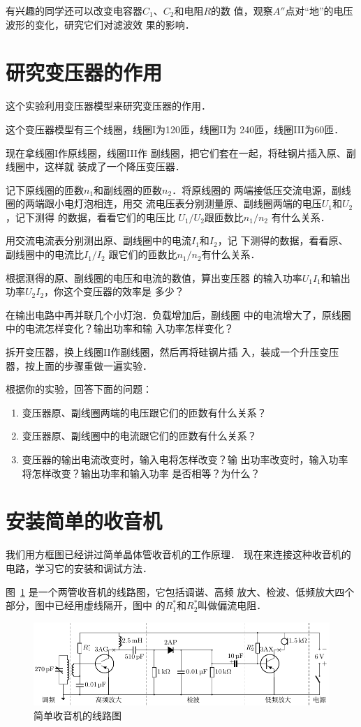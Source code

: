 有兴趣的同学还可以改变电容器$C_1$、$C_2$和电阻$R$的数
值，观察$A''$点对“地”的电压波形的变化，研究它们对滤波效
果的影响．

\section{研究变压器的作用}
这个实验利用变压器模型来研究变压器的作用．

这个变压器模型有三个线圈，线圈I为120匝，线圈II为
240匝，线圈III为60匝．

现在拿线圈I作原线圈，线圈III作
副线圈，把它们套在一起，将硅钢片插入原、副线圈中，这样就
装成了一个降压变压器．

记下原线圈的匝数$n_1$和副线圈的匝数$n_2$．将原线圈的
两端接低压交流电源，副线圈的两端跟小电灯泡相连，用交
流电压表分别测量原、副线圈两端的电压$U_1$和$U_2$，记下测得
的数据，看看它们的电压比
$U_1/U_2$跟匝数比$n_1/n_2$
有什么关系．

用交流电流表分别测出原、副线圈中的电流$I_1$和$I_2$，记
下测得的数据，看看原、副线圈中的电流比$I_1/I_2$
跟它们的匝数比$n_1/n_2$有什么关系．

根据测得的原、副线圈的电压和电流的数值，算出变压器
的输入功率$U_1I_1$和输出功率$U_2I_2$，你这个变压器的效率是
多少？

在输出电路中再并联几个小灯泡．负载增加后，副线圈
中的电流增大了，原线圈中的电流怎样变化？输出功率和输
入功率怎样变化？

拆开变压器，换上线圈II作副线圈，然后再将硅钢片插
入，装成一个升压变压器，按上面的步骤重做一遍实验．

根据你的实验，回答下面的问题：
\begin{enumerate}
    \item 变压器原、副线圈两端的电压跟它们的匝数有什么关系？
    \item 变压器原、副线圈中的电流跟它们的匝数有什么关系？
    \item 变压器的输出电流改变时，输入电将怎样改变？输
出功率改变时，输入功率将怎样改变？输出功率和输入功率
是否相等？为什么？
\end{enumerate}

\section{安装简单的收音机}
我们用方框图已经讲过简单晶体管收音机的工作原理．
现在来连接这种收音机的电路，学习它的安装和调试方法．

图~\ref{fig_C_10-6} 是一个两管收音机的线路图，它包括调谐、高频
放大、检波、低频放大四个部分，图中已经用虚线隔开，图中
的$R_1^*$和$R_2^*$叫做偏流电阻．
\begin{figure}[htbp]
    \centering
    \includegraphics{fig/C/10-6.pdf}
    \caption{简单收音机的线路图}\label{fig_C_10-6}
\end{figure}

